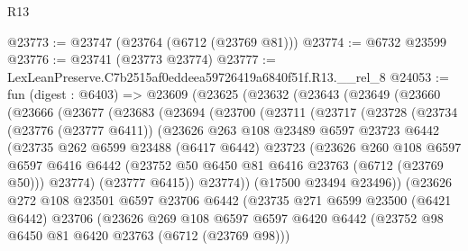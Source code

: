 \begin{lexlean}{R13}
\begin{coremodule}
@23773 := @23747 (@23764 (@6712 (@23769 @81)))
@23774 := @6732 @23599
@23776 := @23741 (@23773 @23774)
@23777 := LexLeanPreserve.C7b2515af0eddeea59726419a6840f51f.R13.__rel_8
@24053 := fun (digest : @6403) =>
  @23609
    (@23625
      (@23632
        (@23643
          (@23649
            (@23660
              (@23666
                (@23677
                  (@23683
                    (@23694
                      (@23700
                        (@23711
                          (@23717
                            (@23728
                              (@23734
                                (@23776 (@23777 @6411))
                                (@23626
                                  @263
                                  @108
                                  @23489
                                  @6597
                                  @23723
                                  @6442
                                  (@23735
                                    @262
                                    @6599
                                    @23488
                                    (@6417 @6442)
                                    @23723
                                    (@23626
                                      @260
                                      @108
                                      @6597
                                      @6597
                                      @6416
                                      @6442
                                      (@23752 @50 @6450 @81 @6416 @23763 (@6712 (@23769 @50)))
                                      @23774)
                                    (@23777 @6415))
                                  @23774))
                              (@17500 @23494 @23496))
                            (@23626
                              @272
                              @108
                              @23501
                              @6597
                              @23706
                              @6442
                              (@23735
                                @271
                                @6599
                                @23500
                                (@6421 @6442)
                                @23706
                                (@23626
                                  @269
                                  @108
                                  @6597
                                  @6597
                                  @6420
                                  @6442
                                  (@23752 @98 @6450 @81 @6420 @23763 (@6712 (@23769 @98)))

\end{coremodule}
\end{lexlean}
